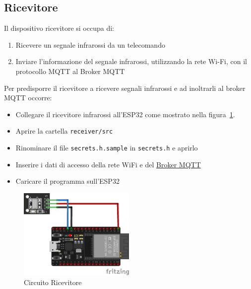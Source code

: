 \documentclass[a4paper,11pt]{article}
\begin{document}
    \subsection{Ricevitore}
    \label{subsec:receiver}

    Il dispositivo ricevitore si occupa di:

    \begin{enumerate}
      \item Ricevere un segnale infrarossi da un telecomando
      \item Inviare l'informazione del segnale infrarossi, utilizzando la rete Wi-Fi, con il protocollo MQTT al Broker MQTT
    \end{enumerate}

    Per predisporre il ricevitore a ricevere segnali infrarossi e ad inoltrarli al broker MQTT occorre:

    \begin{itemize}
      \item Collegare il ricevitore infrarossi all'ESP32 come mostrato nella figura~\ref{fig:circuito_ricevitore}.


      \item Aprire la cartella \texttt{receiver/src}
      \item Rinominare il file \texttt{secrets.h.sample} in \texttt{secrets.h} e aprirlo
      \item Inserire i dati di accesso della rete WiFi e del \hyperref[subsec:Broker]{Broker MQTT}
      \item Caricare il programma sull'ESP32
    \end{itemize}

    \begin{figure}[H]
      \centering
      \includegraphics[width=0.5\textwidth,height=\textheight,keepaspectratio]{assets/receiver_fritzing}
      \caption{Circuito Ricevitore}
      \label{fig:circuito_ricevitore}
    \end{figure}
\end{document}
